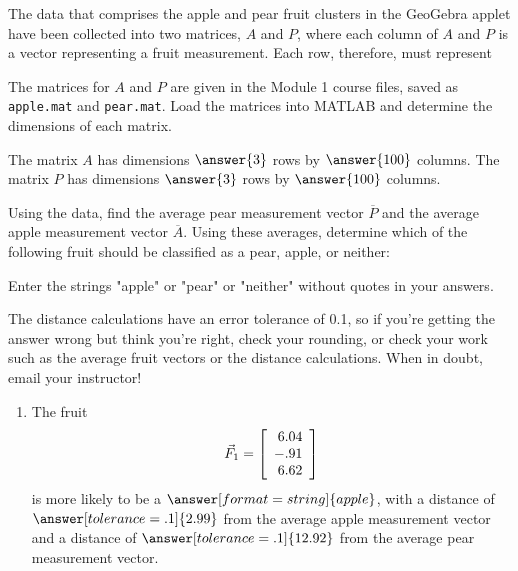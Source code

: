 \documentclass{ximera}
\author{Zack Reed}
\begin{document}
\begin{problem}

The data that comprises the apple and pear fruit clusters in the GeoGebra applet have been collected into two matrices, $A$ and $P$, where each column of $A$ and $P$ is a vector representing a fruit measurement. Each row, therefore, must represent

\begin{multipleChoice}
\end{multipleChoice}

The matrices for $A$ and $P$ are given in the Module 1 course files, saved as \texttt{apple.mat} and \texttt{pear.mat}. Load the matrices into MATLAB and determine the dimensions of each matrix.

The matrix $A$ has dimensions $\answer{3}$ rows by $\answer{100}$ columns. The matrix $P$ has dimensions $\answer{3}$ rows by $\answer{100}$ columns.

Using the data, find the average pear measurement vector $\overline{P}$ and the average apple measurement vector $\overline{A}$. Using these averages, determine which of the following fruit should be classified as a pear, apple, or neither:

\begin{hint}
  Enter the strings "apple" or "pear" or "neither" without quotes in your answers.
  
  The distance calculations have an error tolerance of 0.1, so if you're getting the answer wrong but think you're right, check your rounding, or check your work such as the average fruit vectors or the distance calculations. When in doubt, email your instructor!
\end{hint}

\begin{enumerate}
\item
The fruit
\begin{equation*}
  \vec{F}_1=\startmat{r}
    6.04 \\
    -.91 \\
    6.62
  \stopmat
\end{equation*}
is more likely to be a $\answer[format=string]{apple}$, with a distance of $\answer[tolerance=.1]{2.99}$ from the average apple measurement vector and a distance of $\answer[tolerance=.1]{12.92}$ from the average pear measurement vector.


\end{enumerate}
\end{problem}
\end{document}
